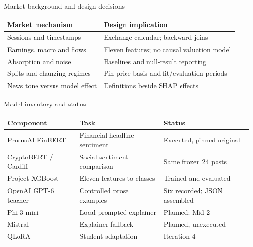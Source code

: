 \documentclass[aspectratio=169,12pt]{beamer}
\begin{document}
\begin{frame}{Market background and design decisions}


\small\begin{tabular}{@{}p{}p{}@{}}\toprule Market mechanism & Design implication\\\midrule
Sessions and timestamps & Exchange calendar; backward joins\\[1.5mm]
Earnings, macro and flows & Eleven features; no causal valuation model\\[1.5mm]
Absorption and noise & Baselines and null-result reporting\\[1.5mm]
Splits and changing regimes & Pin price basis and fit/evaluation periods\\[1.5mm]
News tone versus model effect & Definitions beside SHAP effects\\\bottomrule\end{tabular}



\end{frame}

\begin{frame}{Model inventory and status}


\small\begin{tabular}{@{}p{}p{}p{}@{}}\toprule Component & Task & Status\\\midrule
ProsusAI FinBERT & Financial-headline sentiment & Executed, pinned original\\[.8mm]
CryptoBERT / Cardiff & Social sentiment comparison & Same frozen 24 posts\\[.8mm]
Project XGBoost & Eleven features to classes & Trained and evaluated\\[.8mm]
OpenAI GPT-6 teacher & Controlled prose examples & Six recorded; JSON assembled\\[.8mm]
Phi-3-mini & Local prompted explainer & Planned: Mid-2\\[.8mm]
Mistral & Explainer fallback & Planned, unexecuted\\[.8mm]
QLoRA & Student adaptation & Iteration 4\\\bottomrule\end{tabular}



\end{frame}
\end{document}
